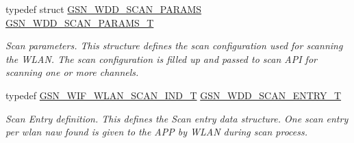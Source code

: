 \begin{DoxyCompactItemize}
typedef struct \hyperlink{a00286}{GSN\_\-WDD\_\-SCAN\_\-PARAMS} \hyperlink{a00677_ga5df05c7cc3d6a8db66ec41eb7c9548e9}{GSN\_\-WDD\_\-SCAN\_\-PARAMS\_\-T}
\begin{DoxyCompactList}\small\item\em Scan parameters. This structure defines the scan configuration used for scanning the WLAN. The scan configuration is filled up and passed to scan API for scanning one or more channels. \end{DoxyCompactList}\item 
typedef \hyperlink{a00400}{GSN\_\-WIF\_\-WLAN\_\-SCAN\_\-IND\_\-T} \hyperlink{a00677_gaca7e9b8176b0ff06a2cb24c84be888ed}{GSN\_\-WDD\_\-SCAN\_\-ENTRY\_\-T}
\begin{DoxyCompactList}\small\item\em Scan Entry definition. This defines the Scan entry data structure. One scan entry per wlan naw found is given to the APP by WLAN during scan process. \end{DoxyCompactList}\end{DoxyCompactItemize}
